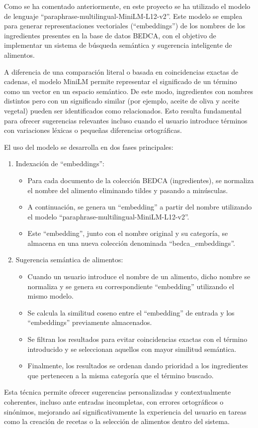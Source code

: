 Como se ha comentado anteriormente, en este proyecto se ha utilizado el modelo de lenguaje ``paraphrase-multilingual-MiniLM-L12-v2''. Este modelo se emplea para generar representaciones vectoriales (``embeddings'') de los nombres de los ingredientes presentes en la base de datos BEDCA, con el objetivo de implementar un sistema de búsqueda semántica y sugerencia inteligente de alimentos.

A diferencia de una comparación literal o basada en coincidencias exactas de cadenas, el modelo MiniLM permite representar el significado de un término como un vector en un espacio semántico. De este modo, ingredientes con nombres distintos pero con un significado similar (por ejemplo, aceite de oliva y aceite vegetal) pueden ser identificados como relacionados. Esto resulta fundamental para ofrecer sugerencias relevantes incluso cuando el usuario introduce términos con variaciones léxicas o pequeñas diferencias ortográficas.

El uso del modelo se desarrolla en dos fases principales:

\begin{enumerate}
    \item Indexación de ``embeddings'':
    \begin{itemize}
        \item Para cada documento de la colección BEDCA (ingredientes), se normaliza el nombre del alimento eliminando tildes y pasando a minúsculas.
        \item A continuación, se genera un ``embedding'' a partir del nombre utilizando el modelo ``paraphrase-multilingual-MiniLM-L12-v2''.
        \item Este ``embedding'', junto con el nombre original y su categoría, se almacena en una nueva colección denominada ``bedca\_embeddings''.
    \end{itemize}
    \item Sugerencia semántica de alimentos:
    \begin{itemize}
        \item Cuando un usuario introduce el nombre de un alimento, dicho nombre se normaliza y se genera su correspondiente ``embedding'' utilizando el mismo modelo.
        \item Se calcula la similitud coseno entre el ``embedding'' de entrada y los ``embeddings'' previamente almacenados.
        \item Se filtran los resultados para evitar coincidencias exactas con el término introducido y se seleccionan aquellos con mayor similitud semántica.
        \item Finalmente, los resultados se ordenan dando prioridad a los ingredientes que pertenecen a la misma categoría que el término buscado.
    \end{itemize}
\end{enumerate}
Esta técnica permite ofrecer sugerencias personalizadas y contextualmente coherentes, incluso ante entradas incompletas, con errores ortográficos o sinónimos, mejorando así significativamente la experiencia del usuario en tareas como la creación de recetas o la selección de alimentos dentro del sistema.

